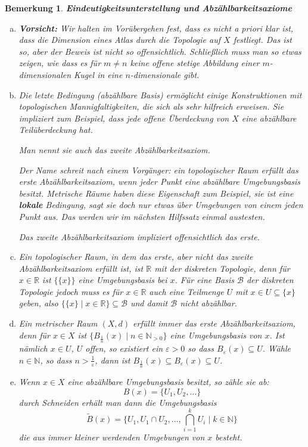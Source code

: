 \documentclass[12pt]{scrbook}   %
\newtheorem{bemX}[alles]{Bemerkung}
\newenvironment{bem}[1]{\begin{bemX}{\bf #1}\par\rm}{\end{bemX}}
\begin{document}
\begin{bem}{Eindeutigkeitsunterstellung und Abzählbarkeitsaxiome}
\begin{enumerate}[a)]
\item 
{\bf Vorsicht:} Wir halten im Vorübergehen fest, dass es nicht {\it a
priori} klar ist, dass die Dimension eines Atlas durch die Topologie auf $X$
festliegt. Das ist so, aber der Beweis ist nicht so offensichtlich.
Schließlich muss man so etwas zeigen, wie dass es für $m\neq n$ keine 
offene stetige Abbildung einer $m$-dimensionalen Kugel in eine 
$n$-dimensionale gibt.

\item
Die letzte Bedingung (abzählbare Basis) ermöglicht einige Konstruktionen mit topologischen 
Mannigfaltigkeiten, die sich als sehr hilfreich erweisen. 
Sie impliziert zum Beispiel, dass jede offene Überdeckung von $X$ eine
abzählbare Teilüberdeckung hat. 

Man nennt sie auch das {\it zweite Abzählbarkeitsaxiom}.


Der Name schreit nach einem Vorgänger: ein topologischer Raum erfüllt das 
{\it erste Abzählbarkeitsaxiom}, wenn jeder Punkt eine abzählbare 
Umgebungsbasis besitzt. Metrische Räume haben diese Eigenschaft zum Beispiel,
sie ist eine {\bf lokale} Bedingung, sagt sie doch nur etwas über Umgebungen 
von einem jeden Punkt aus. Das werden wir im nächsten Hilfssatz einmal
austesten.

Das zweite Abzählbarkeitsaxiom impliziert offensichtlich das erste.

\item Ein topologischer Raum, in dem das erste, aber nicht das zweite Abzählbarkeitsaxiom erfüllt ist, ist $\mathbb R$ mit der diskreten Topologie, denn für $x\in \mathbb R$ ist $\{\{x\}\}$ eine Umgebungsbasis bei $x$. Für eine Basis $\mathcal B$ der diskreten Topologie jedoch muss es für $x\in \mathbb R$ auch eine Teilmenge $U$ mit $x\in U\subseteq\{x\}$ geben, also $\{\{x\}\mid x\in \mathbb R\}\subseteq \mathcal B$ und damit $\mathcal B$ nicht abzählbar.

\item Ein metrischer Raum $(X,d)$ erfüllt immer das erste Abzählbarkeitsaxiom, denn für $x\in X$ ist $\{B_{\frac1n}(x)\mid n\in \mathbb N_{>0}\}$ eine Umgebungsbasis von $x$. Ist nämlich $x\in U$, $U$ offen, so existiert ein $\varepsilon >0$ so dass $B_\varepsilon(x)\subseteq U$. Wähle $n\in \mathbb N$, so dass $n>\frac1\varepsilon$, dann ist $B_{\frac1n}(x)\subseteq B_\varepsilon(x)\subseteq U$.

\item Wenn $x\in X$ eine abzählbare Umgebungsbasis besitzt, so zähle sie ab:
\[
B(x) = \{U_1,U_2,\ldots\}
\]
durch Schneiden erhält man dann die Umgebungsbasis
\[
\tilde B(x) = \{U_1,U_1\cap U_2,\ldots,\bigcap_{i=1}^kU_i \mid k\in\mathbb N\}
\]
die aus immer kleiner werdenden Umgebungen von $x$ besteht.


\end{enumerate}
\end{bem}
\end{document}
